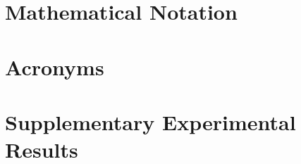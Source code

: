 \documentclass[12pt,a4paper,oneside]{report}
\begin{document}
\clearpage
{}

\tableofcontents
\clearpage

\listoffigures
{}
\clearpage

\listoftables
{}
\clearpage

\chapter*{Mathematical Notation}
\label{ch:math_notation}
\clearpage

\chapter*{Acronyms}
\label{ch:acronyms}
\clearpage

\setcounter{page}{1}












\clearpage
\printbibliography[heading=bibintoc, title={References}]
\label{ch:references}


\appendix





\chapter{Supplementary Experimental Results}
\label{ch:appendix_supp_results}


\end{document}
